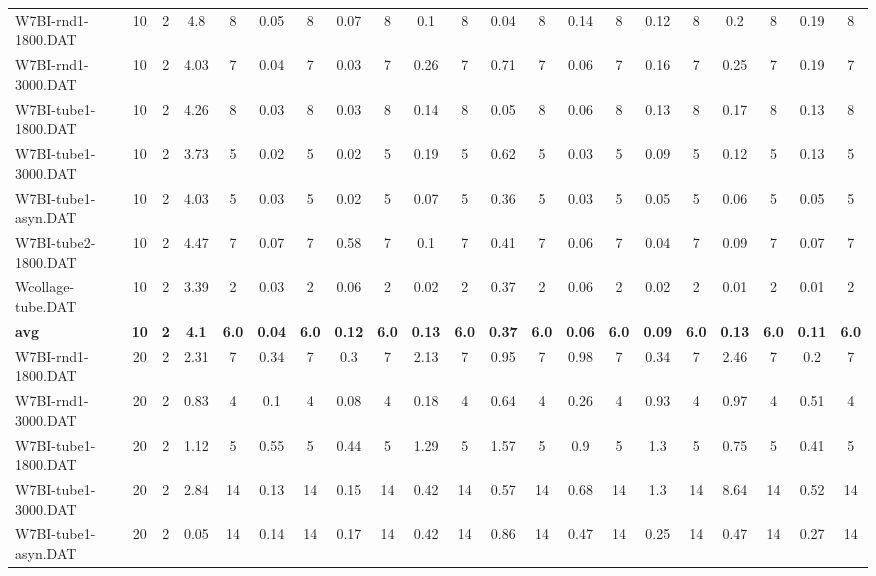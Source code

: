 \begin{sidewaystable}[!ht]
{\begin{tabular}{lcccccccccccccccccccc}
W7BI-rnd1-1800.DAT & 10 & 2 & 4.8 & 8 & 0.05 & 8 & 0.07 & 8 & 0.1 & 8 &  \textcolor{blue2}{0.04} & 8 & 0.14 & 8 & 0.12 & 8 & 0.2 & 8 & 0.19 & 8 \\
W7BI-rnd1-3000.DAT & 10 & 2 & 4.03 & 7 & 0.04 & 7 &  \textcolor{blue2}{0.03} & 7 & 0.26 & 7 & 0.71 & 7 & 0.06 & 7 & 0.16 & 7 & 0.25 & 7 & 0.19 & 7 \\
W7BI-tube1-1800.DAT & 10 & 2 & 4.26 & 8 &  \textcolor{blue2}{0.03} & 8 &  \textcolor{blue2}{0.03} & 8 & 0.14 & 8 & 0.05 & 8 & 0.06 & 8 & 0.13 & 8 & 0.17 & 8 & 0.13 & 8 \\
W7BI-tube1-3000.DAT & 10 & 2 & 3.73 & 5 &  \textcolor{blue2}{0.02} & 5 &  \textcolor{blue2}{0.02} & 5 & 0.19 & 5 & 0.62 & 5 & 0.03 & 5 & 0.09 & 5 & 0.12 & 5 & 0.13 & 5 \\
W7BI-tube1-asyn.DAT & 10 & 2 & 4.03 & 5 & 0.03 & 5 &  \textcolor{blue2}{0.02} & 5 & 0.07 & 5 & 0.36 & 5 & 0.03 & 5 & 0.05 & 5 & 0.06 & 5 & 0.05 & 5 \\
W7BI-tube2-1800.DAT & 10 & 2 & 4.47 & 7 & 0.07 & 7 & 0.58 & 7 & 0.1 & 7 & 0.41 & 7 & 0.06 & 7 &  \textcolor{blue2}{0.04} & 7 & 0.09 & 7 & 0.07 & 7 \\
Wcollage-tube.DAT & 10 & 2 & 3.39 & 2 & 0.03 & 2 & 0.06 & 2 & 0.02 & 2 & 0.37 & 2 & 0.06 & 2 & 0.02 & 2 &  \textcolor{blue2}{0.01} & 2 &  \textcolor{blue2}{0.01} & 2 \\
\cline{1-21} \textbf{avg} & \textbf{10} & \textbf{2} & \textbf{4.1} & \textbf{6.0} & \textbf{0.04} & \textbf{6.0} & \textbf{0.12} & \textbf{6.0} & \textbf{0.13} & \textbf{6.0} & \textbf{0.37} & \textbf{6.0} & \textbf{0.06} & \textbf{6.0} & \textbf{0.09} & \textbf{6.0} & \textbf{0.13} & \textbf{6.0} & \textbf{0.11} & \textbf{6.0} \\ \cline{1-21}
W7BI-rnd1-1800.DAT & 20 & 2 & 2.31 & 7 & 0.34 & 7 & 0.3 & 7 & 2.13 & 7 & 0.95 & 7 & 0.98 & 7 & 0.34 & 7 & 2.46 & 7 &  \textcolor{blue2}{0.2} & 7 \\
W7BI-rnd1-3000.DAT & 20 & 2 & 0.83 & 4 & 0.1 & 4 &  \textcolor{blue2}{0.08} & 4 & 0.18 & 4 & 0.64 & 4 & 0.26 & 4 & 0.93 & 4 & 0.97 & 4 & 0.51 & 4 \\
W7BI-tube1-1800.DAT & 20 & 2 & 1.12 & 5 & 0.55 & 5 & 0.44 & 5 & 1.29 & 5 & 1.57 & 5 & 0.9 & 5 & 1.3 & 5 & 0.75 & 5 &  \textcolor{blue2}{0.41} & 5 \\
W7BI-tube1-3000.DAT & 20 & 2 & 2.84 & 14 &  \textcolor{blue2}{0.13} & 14 & 0.15 & 14 & 0.42 & 14 & 0.57 & 14 & 0.68 & 14 & 1.3 & 14 & 8.64 & 14 & 0.52 & 14 \\
W7BI-tube1-asyn.DAT & 20 & 2 &  \textcolor{blue2}{0.05} & 14 & 0.14 & 14 & 0.17 & 14 & 0.42 & 14 & 0.86 & 14 & 0.47 & 14 & 0.25 & 14 & 0.47 & 14 & 0.27 & 14 \\

\end{tabular}}
\end{sidewaystable}
